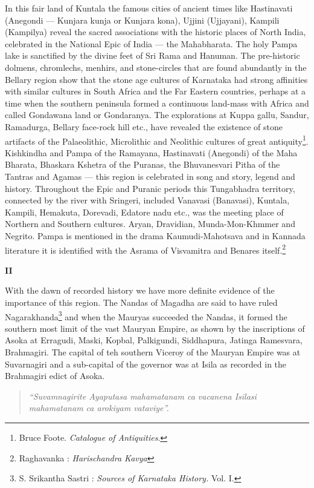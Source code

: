 \documentclass{book}
\begin{document}
In this fair land of Kuntala the famous cities of ancient times like Hastinavati (Anegondi --- Kunjara kunja or Kunjara kona), Ujjini (Ujjayani), Kampili (Kampilya) reveal the sacred associations with the historic places of North India, celebrated in the National Epic of India --- the Mahabharata. The holy Pampa lake is sanctified by the divine feet of Sri Rama and Hanuman. The pre-historic dolmens, chromlechs, menhirs, and stone-circles that are found abundantly in the Bellary region show that the stone age cultures of Karnataka had strong affinities with similar cultures in South Africa and the Far Eastern countries, perhaps at a time when the southern peninsula formed a continuous land-mass with Africa and called Gondawana land or Gondaranya. The explorations at Kuppa gallu, Sandur, Ramadurga, Bellary face-rock hill etc., have revealed the existence of stone artifacts of the Palaeolithic, Microlithic and Neolithic cultures of great antiquity\footnote[2]{Bruce Foote. {\em Catalogue of Antiquities}.}. Kishkindha and Pampa of the Ramayana, Hastinavati (Anegondi) of the Maha Bharata, Bhaskara Kshetra of the Puranas, the Bhuvanesvari Pitha of the Tantras and Agamas --- this region is celebrated in song and story, legend and history. Throughout the Epic and Puranic periods this Tungabhadra territory, connected by the river with Sringeri, included Vanavasi (Banavasi), Kuntala, Kampili, Hemakuta, Dorevadi, Edatore nadu etc., was the meeting place of Northern and Southern cultures. Aryan, Dravidian, Munda-Mon-Khmmer and Negrito. Pampa is mentioned in the drama Kaumudi-Mahotsava and in Kannada literature it is identified with the Asrama of Visvamitra and Benares itself.\footnote[3]{Raghavanka : {\em Harischandra Kavya}}

\medskip
\begin{center}
{\bf II}
\end{center}
\smallskip

With the dawn of recorded history we have more definite evidence of the importance of this region. The Nandas of Magadha are said to have ruled Nagarakhanda\footnote[4]{S. Srikantha Sastri : {\em Sources of Karnataka History.} Vol. I.} and when the Mauryas succeeded the Nandas, it formed the southern most limit of the vast Mauryan Empire, as shown by the inscriptions of Asoka at Erragudi, Maski, Kopbal, Palkigundi, Siddhapura, Jatinga Ramesvara, Brahmagiri. The capital of teh southern Viceroy of the Mauryan Empire was at Suvarnagiri and a sub-capital of the governor was at Isila as recorded in the Brahmagiri edict of Asoka.
\begin{quote}
{\em ``Suvamnagirite Ayaputasa mahamatanam ca vacanena Isilasi mahamatanam ca arokiyam vataviye''.}
\end{quote}
\end{document}
